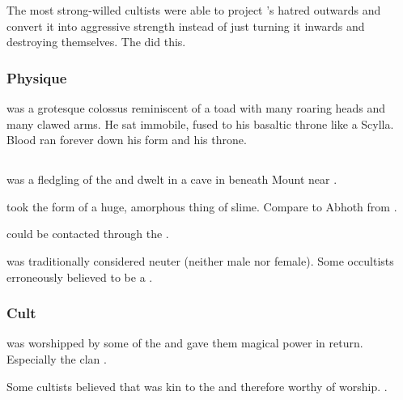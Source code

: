 The most strong-willed cultists were able to project \Malgaddon's hatred outwards and convert it into aggressive strength instead of just turning it inwards and destroying themselves. 
The \aryothim did this. 









\subsubsection{Physique}
\Malgaddon was a grotesque colossus reminiscent of a toad with many roaring heads and many clawed arms.
He sat immobile, fused to his basaltic throne like a Scylla. 
Blood ran forever down his form and his throne. 









\subsection{\Ubloth}
\index{\Ubloth}
\Ubloth was a fledgling of the  and dwelt in a cave in  beneath Mount  near . 

\Ubloth took the form of a huge, amorphous thing of slime. 
Compare to Abhoth from \cite{ClarkAshtonSmith:TheSevenGeases}.

\Ubloth could be contacted through the . 

\Ubloth was traditionally considered neuter (neither male nor female). 
Some occultists erroneously believed \Ubloth to be a \xs. 





\subsubsection{Cult}
\Ubloth was worshipped by some of the  and gave them magical power in return. 
Especially the  clan . 

Some cultists believed that \Ubloth was kin to the \Ortaican {} and therefore worthy of worship.
. 





